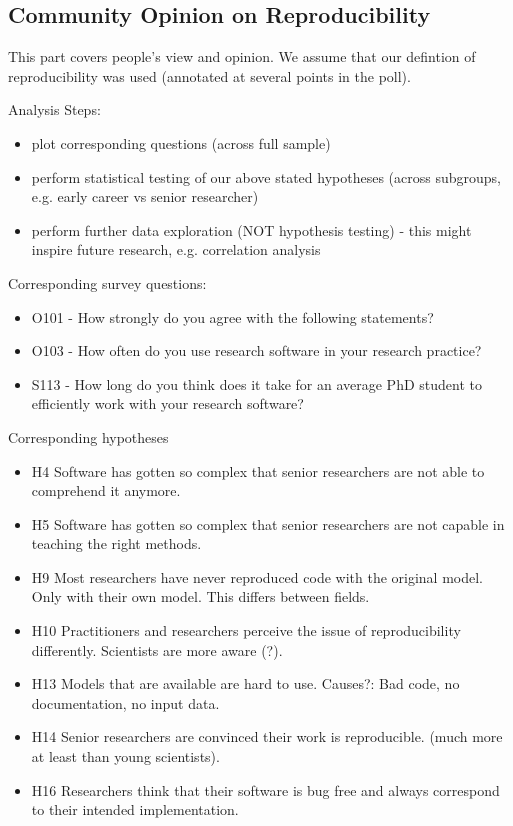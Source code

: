 \documentclass{article}
\begin{document}
\subsection{Community Opinion on Reproducibility}
This part covers people's view and opinion.
We assume that our defintion of reproducibility was used (annotated at several points in the poll).

Analysis Steps:
\begin{itemize}
	\item plot corresponding questions (across full sample)
	\item perform statistical testing of our above stated hypotheses (across subgroups, e.g. early career vs senior researcher)
	\item perform further data exploration (NOT hypothesis testing) - this might inspire future research, e.g. correlation analysis
\end{itemize}
 
Corresponding survey questions:
\begin{itemize}
	\item O101 - How strongly do you agree with the following statements?
	\item O103 - How often do you use research software in your research practice?
	\item S113 - How long do you think does it take for an average PhD student to efficiently work with your research software?
\end{itemize}

Corresponding hypotheses
\begin{itemize}
	\item H4 Software has gotten so complex that senior researchers are not able to comprehend it anymore. 
	\item H5 Software has gotten so complex that senior researchers are not capable in teaching the right methods. 
	\item H9 Most researchers have never reproduced code with the original model. Only with their own model. This differs between fields. 
	\item H10 Practitioners and researchers perceive the issue of reproducibility differently. Scientists are more aware (?).
	\item H13 Models that are available are hard to use. Causes?: Bad code, no documentation, no input data.
	\item H14 Senior researchers are convinced their work is reproducible. (much more at least than young scientists).
	\item H16 Researchers think that their software is bug free and always correspond to their intended implementation.
\end{itemize}
\end{document}
